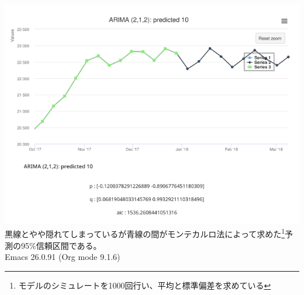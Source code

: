 \documentclass{scrartcl}
\begin{document}
\newpage
\includegraphics [width=16cm] {./rect1673.png}
　黒線とやや隠れてしまっているが青線の間がモンテカルロ法によって求めた\footnote{モデルのシミュレートを1000回行い、平均と標準偏差を求めている}予測の95\%信頼区間である。\\
\newpage
\printbibliography
Emacs 26.0.91 (Org mode 9.1.6)
\end{document}
